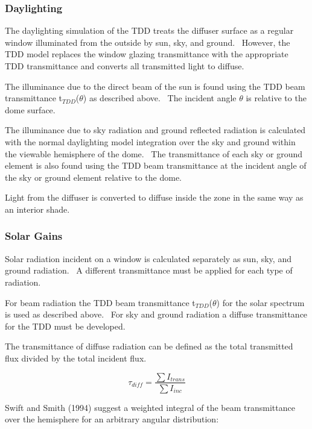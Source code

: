 \subsubsection{Daylighting}\label{daylighting}

The daylighting simulation of the TDD treats the diffuser surface as a regular window illuminated from the outside by sun, sky, and ground.~ However, the TDD model replaces the window glazing transmittance with the appropriate TDD transmittance and converts all transmitted light to diffuse.

The illuminance due to the direct beam of the sun is found using the TDD beam transmittance t\(_{TDD}\)(\(\theta\)) as described above.~ The incident angle \(\theta\) is relative to the dome surface.

The illuminance due to sky radiation and ground reflected radiation is calculated with the normal daylighting model integration over the sky and ground within the viewable hemisphere of the dome.~ The transmittance of each sky or ground~ element is also found using the TDD beam transmittance at the incident angle of the sky or ground element relative to the dome.

Light from the diffuser is converted to diffuse inside the zone in the same way as an interior shade.

\subsubsection{Solar Gains}\label{solar-gains}

Solar radiation incident on a window is calculated separately as sun, sky, and ground radiation.~ A different transmittance must be applied for each type of radiation.

For beam radiation the TDD beam transmittance t\(_{TDD}\)(\(\theta\)) for the solar spectrum is used as described above.~ For sky and ground radiation a diffuse transmittance for the TDD must be developed.

The transmittance of diffuse radiation can be defined as the total transmitted flux divided by the total incident flux.

\begin{equation}
{\tau_{diff}} = \frac{{\sum {{I_{trans}}} }}{{\sum {{I_{inc}}} }}
\end{equation}

Swift and Smith (1994) suggest a weighted integral of the beam transmittance over the hemisphere for an arbitrary angular distribution:

